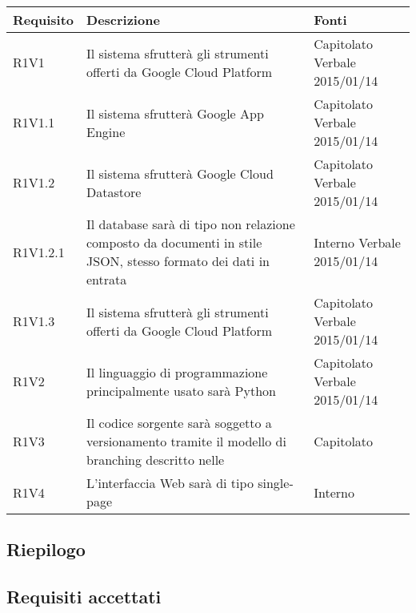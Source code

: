 \begin{center}

	\def\arraystretch{1.5}
	\bgroup
	\begin{longtable}{| p{2cm} | p{8cm} | p{2cm} |}

		\hline
		\textbf{Requisito} & \textbf{Descrizione} & \textbf{Fonti} \\
		\hline

		R1V1  &  Il sistema sfrutterà gli strumenti offerti da Google Cloud Platform  &  Capitolato \newline Verbale 2015/01/14 \\
		\hline
		R1V1.1  &  Il sistema sfrutterà Google App Engine  &  Capitolato \newline Verbale 2015/01/14 \\
		\hline
		R1V1.2  &  Il sistema sfrutterà Google Cloud Datastore  &  Capitolato \newline Verbale 2015/01/14 \\
		\hline
		R1V1.2.1  &  Il database sarà di tipo non relazione composto da documenti in stile JSON, stesso formato dei dati in entrata  &  Interno \newline Verbale 2015/01/14 \\
		\hline
		R1V1.3  &  Il sistema sfrutterà gli strumenti offerti da Google Cloud Platform  &  Capitolato \newline Verbale 2015/01/14 \\
		\hline
		R1V2  &  Il linguaggio di programmazione principalmente usato sarà Python  &  Capitolato \newline Verbale 2015/01/14 \\
		\hline
		R1V3  &  Il codice sorgente sarà soggetto a versionamento tramite il modello di branching descritto nelle \docNameVersionNdP  &  Capitolato \\
		\hline
		R1V4  &  L'interfaccia Web sarà di tipo single-page  &  Interno \\
		\hline

	\end{longtable}
	\egroup
\end{center}

\subsection{Riepilogo}

\subsection{Requisiti accettati}
